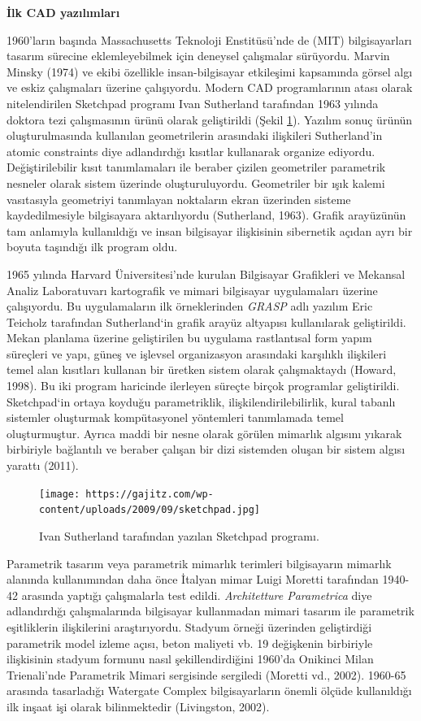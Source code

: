 \documentclass[12pt,turkish,a4paperpaper,]{report}
\begin{document}
\textbf{İlk CAD yazılımları}

1960'ların başında Massachusetts Teknoloji Enstitüsü'nde de (MIT)
bilgisayarları tasarım sürecine eklemleyebilmek için deneysel çalışmalar
sürüyordu. Marvin Minsky (1974) ve ekibi özellikle insan-bilgisayar
etkileşimi kapsamında görsel algı ve eskiz çalışmaları üzerine
çalışıyordu. Modern CAD programlarının atası olarak nitelendirilen
Sketchpad programı Ivan Sutherland tarafından 1963 yılında doktora tezi
çalışmasının ürünü olarak geliştirildi (Şekil \ref{Sketchpad}). Yazılım
sonuç ürünün oluşturulmasında kullanılan geometrilerin arasındaki
ilişkileri Sutherland'in atomic constraints diye adlandırdığı kısıtlar
kullanarak organize ediyordu. Değiştirilebilir kısıt tanımlamaları ile
beraber çizilen geometriler parametrik nesneler olarak sistem üzerinde
oluşturuluyordu. Geometriler bir ışık kalemi vasıtasıyla geometriyi
tanımlayan noktaların ekran üzerinden sisteme kaydedilmesiyle
bilgisayara aktarılıyordu (Sutherland, 1963). Grafik arayüzünün tam
anlamıyla kullanıldığı ve insan bilgisayar ilişkisinin sibernetik açıdan
ayrı bir boyuta taşındığı ilk program oldu.

1965 yılında Harvard Üniversitesi'nde kurulan Bilgisayar Grafikleri ve
Mekansal Analiz Laboratuvarı kartografik ve mimari bilgisayar
uygulamaları üzerine çalışıyordu. Bu uygulamaların ilk örneklerinden
\emph{GRASP} adlı yazılım Eric Teicholz tarafından Sutherland`in grafik
arayüz altyapısı kullanılarak geliştirildi. Mekan planlama üzerine
geliştirilen bu uygulama rastlantısal form yapım süreçleri ve yapı,
güneş ve işlevsel organizasyon arasındaki karşılıklı ilişkileri temel
alan kısıtları kullanan bir üretken sistem olarak çalışmaktaydı (Howard,
1998). Bu iki program haricinde ilerleyen süreçte birçok programlar
geliştirildi. Sketchpad`in ortaya koyduğu parametriklik,
ilişkilendirilebilirlik, kural tabanlı sistemler oluşturmak
kompütasyonel yöntemleri tanımlamada temel oluşturmuştur. Ayrıca maddi
bir nesne olarak görülen mimarlık algısını yıkarak birbiriyle bağlantılı
ve beraber çalışan bir dizi sistemden oluşan bir sistem algısı yarattı
(2011).

\begin{figure}
\centering
\texttt{[image: https://gajitz.com/wp-content/uploads/2009/09/sketchpad.jpg]}
\caption{Ivan Sutherland tarafından yazılan Sketchpad programı.
\label{Sketchpad}}
\end{figure}

Parametrik tasarım veya parametrik mimarlık terimleri bilgisayarın
mimarlık alanında kullanımından daha önce İtalyan mimar Luigi Moretti
tarafından 1940-42 arasında yaptığı çalışmalarla test edildi.
\emph{Architetture Parametrica} diye adlandırdığı çalışmalarında
bilgisayar kullanmadan mimari tasarım ile parametrik eşitliklerin
ilişkilerini araştırıyordu. Stadyum örneği üzerinden geliştirdiği
parametrik model izleme açısı, beton maliyeti vb. 19 değişkenin
birbiriyle ilişkisinin stadyum formunu nasıl şekillendirdiğini 1960'da
Onikinci Milan Trienali'nde Parametrik Mimari sergisinde sergiledi
(Moretti vd., 2002). 1960-65 arasında tasarladığı Watergate Complex
bilgisayarların önemli ölçüde kullanıldığı ilk inşaat işi olarak
bilinmektedir (Livingston, 2002).
\end{document}
